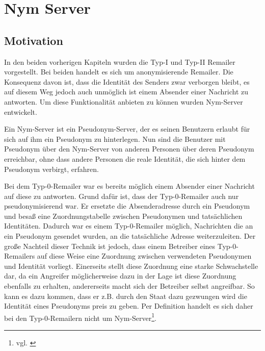 \chapter{Nym Server}

\section{Motivation}
In den beiden vorherigen Kapiteln wurden die Typ-I und Typ-II Remailer vorgestellt. Bei beiden handelt es sich um anonymisierende Remailer. Die Konsequenz davon ist, dass die Identität des Senders zwar verborgen bleibt, es auf diesem Weg jedoch auch unmöglich ist einem Absender einer Nachricht zu antworten. Um diese Funktionalität anbieten zu können wurden Nym-Server entwickelt.

Ein Nym-Server ist ein Pseudonym-Server, der es seinen Benutzern erlaubt für sich auf ihm ein Pseudonym zu hinterlegen. Nun sind die Benutzer mit Pseudonym über den Nym-Server von anderen Personen über deren Pseudonym erreichbar, ohne dass andere Personen die reale Identität, die sich hinter dem Pseudonym verbirgt, erfahren.

Bei dem Typ-0-Remailer war es bereits möglich einem Absender einer Nachricht auf diese zu antworten. Grund dafür ist, dass der Typ-0-Remailer auch nur pseudonymisierend war. Er ersetzte die Absenderadresse durch ein Pseudonym und besaß eine Zuordnungstabelle zwischen Pseudonymen und tatsächlichen Identitäten. Dadurch war es einem Typ-0-Remailer möglich, Nachrichten die an ein Pseudonym gesendet wurden, an die tatsächliche Adresse weiterzuleiten. Der große Nachteil dieser Technik ist jedoch, dass einem Betreiber eines Typ-0-Remailers auf diese Weise eine Zuordnung zwischen verwendeten Pseudonymen und Identität vorliegt. Einerseits stellt diese Zuordnung eine starke Schwachstelle dar, da ein Angreifer möglicherweise dazu in der Lage ist diese Zuordnung ebenfalls zu erhalten, andererseits macht sich der Betreiber selbst angreifbar. So kann es dazu kommen, dass er z.B. durch den Staat dazu gezwungen wird die Identität eines Pseudonyms preis zu geben. Per Definition handelt es sich daher bei den Typ-0-Remailern nicht um Nym-Server\footnote{vgl. \cite{nymdefinition}}.

